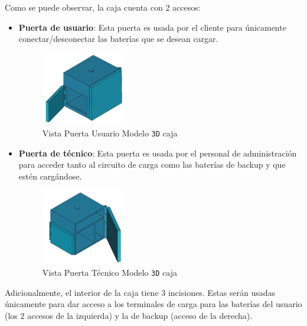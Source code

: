 Como se puede observar, la caja cuenta con 2 accesos:
\begin{itemize}
    \item \textbf{Puerta de usuario}: Esta puerta es usada por el cliente para únicamente conectar/desconectar las baterías que se desean cargar.

\begin{figure}[H]
    \centering
    \includegraphics[width=0.35\textwidth]{images/4-DesarrolloTeorico/4-1-caja/CAJA_3D_PUERTA_USER.png}
    \caption{Vista Puerta Usuario Modelo \texttt{3D} caja}
    \label{fig:DesarrolloTeorico/Caja/CAJA_3D_PUERTA_USER}
\end{figure}

    \item \textbf{Puerta de técnico}: Esta puerta es usada por el personal de administración para acceder tanto al circuito de carga como las baterías de backup y que estén cargándose.
\begin{figure}[H]
    \centering
    \includegraphics[width=0.35\textwidth]{images/4-DesarrolloTeorico/4-1-caja/CAJA_3D_PUERTA_ADMIN.png}
    \caption{Vista Puerta Técnico Modelo \texttt{3D} caja}
    \label{fig:DesarrolloTeorico/Caja/CAJA_3D_PUERTA_ADMIN}
\end{figure}

\end{itemize}

Adicionalmente, el interior de la caja tiene 3 incisiones. Estas serán usadas únicamente para dar acceso a los terminales de carga para las baterías del usuario (los 2 accesos de la izquierda) y la de backup (acceso de la derecha).

